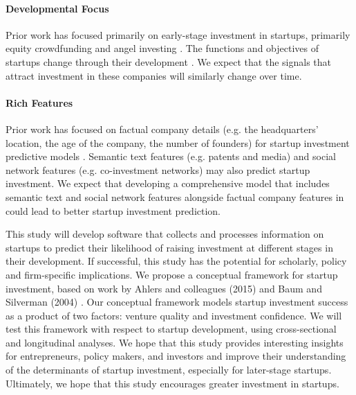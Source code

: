 \documentclass[../thesis/thesis.tex]{subfiles}
\begin{document}
\paragraph{Developmental Focus}

Prior work has focused primarily on early-stage investment in startups, primarily equity crowdfunding \cite{beckwith2016, ahlers2015, cheng2016, yuan2016} and angel investing \cite{croce2016}. The functions and objectives of startups change through their development \cite{mccullen2013}. We expect that the signals that attract investment in these companies will similarly change over time.

\paragraph{Rich Features}

Prior work has focused on factual company details (e.g. the headquarters' location, the age of the company, the number of founders) for startup investment predictive models \cite{beckwith2016, dixon2014, gimmon2010}. Semantic text features (e.g. patents and media) \cite{hoenen2014, yuan2016, wei2008} and social network features (e.g. co-investment networks) \cite{wang2016, werth2013, cheng2016, yu2015} may also predict startup investment. We expect that developing a comprehensive model that includes semantic text and social network features alongside factual company features in could lead to better startup investment prediction.


This study will develop software that collects and processes information on startups to predict their likelihood of raising investment at different stages in their development. If successful, this study has the potential for scholarly, policy and firm-specific implications. We propose a conceptual framework for startup investment, based on work by Ahlers and colleagues (2015) \cite{ahlers2015} and Baum and Silverman (2004) \cite{baum2004}. Our conceptual framework models startup investment success as a product of two factors: venture quality and investment confidence. We will test this framework with respect to startup development, using cross-sectional and longitudinal analyses. We hope that this study provides interesting insights for entrepreneurs, policy makers, and investors and improve their understanding of the determinants of startup investment, especially for later-stage startups. Ultimately, we hope that this study encourages greater investment in startups.
\end{document}
